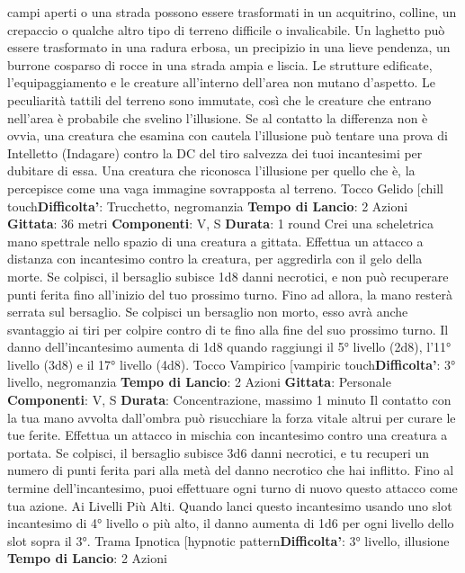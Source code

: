 \begin{multicols}{2}
campi aperti o una strada possono essere trasformati in
un acquitrino, colline, un crepaccio o qualche altro tipo
di terreno difficile o invalicabile. Un laghetto può essere
trasformato in una radura erbosa, un precipizio in una
lieve pendenza, un burrone cosparso di rocce in una
strada ampia e liscia. Le strutture edificate,
l’equipaggiamento e le creature all’interno dell’area non
mutano d’aspetto.
Le peculiarità tattili del terreno sono immutate, così che
le creature che entrano nell’area è probabile che
svelino l’illusione. Se al contatto la differenza non è
ovvia, una creatura che esamina con cautela l’illusione
può tentare una prova di Intelletto (Indagare) contro
la DC del tiro salvezza dei tuoi incantesimi per dubitare
di essa. Una creatura che riconosca l’illusione per
quello che è, la percepisce come una vaga immagine
sovrapposta al terreno.
Tocco Gelido
[chill touch\textbf{Difficolta'}:
Trucchetto, negromanzia
\textbf{Tempo di Lancio}: 2 Azioni
\textbf{Gittata}: 36 metri
\textbf{Componenti}: V, S
\textbf{Durata}: 1 round
Crei una scheletrica mano spettrale nello spazio di una
creatura a gittata. Effettua un attacco a distanza con
incantesimo contro la creatura, per aggredirla con il
gelo della morte. Se colpisci, il bersaglio subisce 1d8
danni necrotici, e non può recuperare punti ferita fino
all’inizio del tuo prossimo turno. Fino ad allora, la mano
resterà serrata sul bersaglio.
Se colpisci un bersaglio non morto, esso avrà anche
svantaggio ai tiri per colpire contro di te fino alla fine del
suo prossimo turno.
Il danno dell’incantesimo aumenta di 1d8 quando
raggiungi il 5° livello (2d8), l’11° livello (3d8) e il 17°
livello (4d8).
Tocco Vampirico
[vampiric touch\textbf{Difficolta'}:
3° livello, negromanzia
\textbf{Tempo di Lancio}: 2 Azioni
\textbf{Gittata}: Personale
\textbf{Componenti}: V, S
\textbf{Durata}: Concentrazione, massimo 1 minuto
Il contatto con la tua mano avvolta dall’ombra può
risucchiare la forza vitale altrui per curare le tue ferite.
Effettua un attacco in mischia con incantesimo contro
una creatura a portata. Se colpisci, il bersaglio subisce
3d6 danni necrotici, e tu recuperi un numero di punti
ferita pari alla metà del danno necrotico che hai inflitto.
Fino al termine dell’incantesimo, puoi effettuare ogni
turno di nuovo questo attacco come tua azione.
Ai Livelli Più Alti. Quando lanci questo incantesimo
usando uno slot incantesimo di 4° livello o più alto, il
danno aumenta di 1d6 per ogni livello dello slot sopra il
3°.
Trama Ipnotica
[hypnotic pattern\textbf{Difficolta'}:
3° livello, illusione
\textbf{Tempo di Lancio}: 2 Azioni

\end{multicols}
